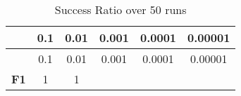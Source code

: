 \documentclass[12pt,a4paper]{article}
\begin{document}
\begin{longtable}[c]{@{}cccccc@{}}
\caption{Success Ratio over 50 runs}\tabularnewline
\toprule
\begin{minipage}[b]{0.12\columnwidth}\centering\strut
~
\strut\end{minipage} &
\begin{minipage}[b]{0.07\columnwidth}\centering\strut
0.1
\strut\end{minipage} &
\begin{minipage}[b]{0.08\columnwidth}\centering\strut
0.01
\strut\end{minipage} &
\begin{minipage}[b]{0.09\columnwidth}\centering\strut
0.001
\strut\end{minipage} &
\begin{minipage}[b]{0.10\columnwidth}\centering\strut
0.0001
\strut\end{minipage} &
\begin{minipage}[b]{0.10\columnwidth}\centering\strut
0.00001
\strut\end{minipage}\tabularnewline
\midrule
\endfirsthead
\toprule
\begin{minipage}[b]{0.12\columnwidth}\centering\strut
~
\strut\end{minipage} &
\begin{minipage}[b]{0.07\columnwidth}\centering\strut
0.1
\strut\end{minipage} &
\begin{minipage}[b]{0.08\columnwidth}\centering\strut
0.01
\strut\end{minipage} &
\begin{minipage}[b]{0.09\columnwidth}\centering\strut
0.001
\strut\end{minipage} &
\begin{minipage}[b]{0.10\columnwidth}\centering\strut
0.0001
\strut\end{minipage} &
\begin{minipage}[b]{0.10\columnwidth}\centering\strut
0.00001
\strut\end{minipage}\tabularnewline
\midrule
\endhead
\begin{minipage}[t]{0.12\columnwidth}\centering\strut
\textbf{F1}
\strut\end{minipage} &
\begin{minipage}[t]{0.07\columnwidth}\centering\strut
1
\strut\end{minipage} &
\begin{minipage}[t]{0.08\columnwidth}\centering\strut
1
\strut\end{minipage} &

\end{longtable}
\end{document}
